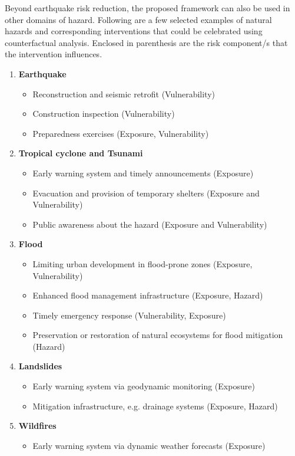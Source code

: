 \documentclass[utf8]{frontiersSCNS} %
\begin{document}
Beyond earthquake risk reduction, the proposed framework can also be used in other domains of hazard. Following are a few selected examples of natural hazards and corresponding interventions that could be celebrated using counterfactual analysis. Enclosed in parenthesis are the risk component/s that the intervention influences.

\begin{enumerate}

    \item \textbf{Earthquake}
    \begin{itemize}
            \item Reconstruction and seismic retrofit (Vulnerability)
            \item Construction inspection (Vulnerability)
            \item Preparedness exercises (Exposure, Vulnerability)
    \end{itemize}
    
    \item \textbf{Tropical cyclone and Tsunami}
    \begin{itemize}
            \item Early warning system and timely announcements (Exposure)
            \item Evacuation and provision of temporary shelters (Exposure and Vulnerability)
            \item Public awareness about the hazard (Exposure and Vulnerability)
    \end{itemize}
    
    \item \textbf{Flood}
    \begin{itemize}
            \item Limiting urban development in flood-prone zones (Exposure, Vulnerability)
            \item Enhanced flood management infrastructure (Exposure, Hazard)
            \item Timely emergency response (Vulnerability, Exposure)
            \item Preservation or restoration of natural ecosystems for flood mitigation (Hazard)
    \end{itemize}

    \item \textbf{Landslides}
    \begin{itemize}
            \item Early warning system via geodynamic monitoring (Exposure)
            \item Mitigation infrastructure, e.g. drainage systems (Exposure, Hazard)
    \end{itemize}

    \item \textbf{Wildfires}
    \begin{itemize}
            \item Early warning system via dynamic weather forecasts (Exposure)
    \end{itemize}

\end{enumerate}
\end{document}
